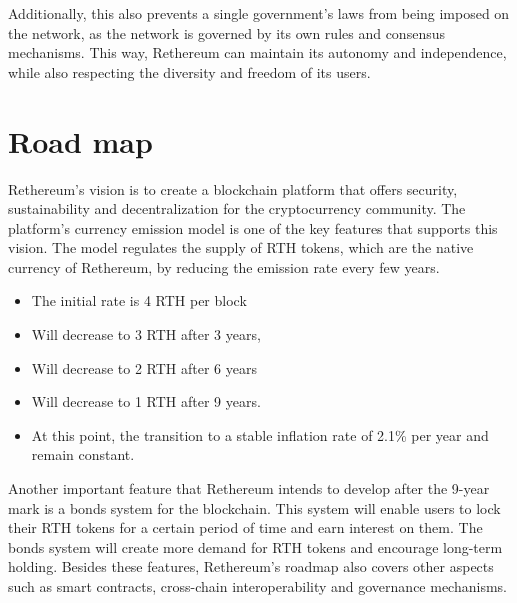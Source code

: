 \documentclass[a4paper,onecolumn, superscriptaddress,10pt,accepted=2020-05-01,issue=1, volume=2, shorttitle=papers]{compositionalityarticle}
\begin{document}
\vspace{0.3cm}

Additionally, this also prevents a single government's laws from being imposed on the network, as the network is governed by its own rules and consensus mechanisms. This way, Rethereum can maintain its autonomy and independence, while also respecting the diversity and freedom of its users.

\vspace{1cm}

\section{Road map}

Rethereum's vision is to create a blockchain platform that offers security, sustainability and decentralization for the cryptocurrency community. The platform's currency emission model is one of the key features that supports this vision. The model regulates the supply of RTH tokens, which are the native currency of Rethereum, by reducing the emission rate every few years. 

\begin{itemize}
    \item The initial rate is 4 RTH per block
\end{itemize}
\begin{itemize}
    \item Will decrease to 3 RTH after 3 years,
\end{itemize}
\begin{itemize}
    \item Will decrease to 2 RTH after 6 years
\end{itemize}
\begin{itemize}
    \item Will decrease to 1 RTH after 9 years.
    \item At this point, the transition to a stable inflation rate of 2.1\% per year and remain constant.
\end{itemize}

Another important feature that Rethereum intends to develop after the 9-year mark is a bonds system for the blockchain. This system will enable users to lock their RTH tokens for a certain period of time and earn interest on them. The bonds system will create more demand for RTH tokens and encourage long-term holding. Besides these features, Rethereum's roadmap also covers other aspects such as smart contracts, cross-chain interoperability and governance mechanisms.
\end{document}
